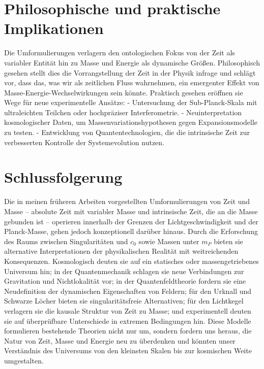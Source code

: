 \documentclass[a4paper,12pt]{article}
\begin{document}
	\section{Philosophische und praktische Implikationen}
	Die Umformulierungen verlagern den ontologischen Fokus von der Zeit als variabler Entität hin zu Masse und Energie als dynamische Größen. Philosophisch gesehen stellt dies die Vorrangstellung der Zeit in der Physik infrage und schlägt vor, dass das, was wir als zeitlichen Fluss wahrnehmen, ein emergenter Effekt von Masse-Energie-Wechselwirkungen sein könnte. Praktisch gesehen eröffnen sie Wege für neue experimentelle Ansätze:
	- Untersuchung der Sub-Planck-Skala mit ultraleichten Teilchen oder hochpräziser Interferometrie.
	- Neuinterpretation kosmologischer Daten, um Massenvariationshypothesen gegen Expansionsmodelle zu testen.
	- Entwicklung von Quantentechnologien, die die intrinsische Zeit zur verbesserten Kontrolle der Systemevolution nutzen.
	
	\section{Schlussfolgerung}
	Die in meinen früheren Arbeiten vorgestellten Umformulierungen von Zeit und Masse – absolute Zeit mit variabler Masse und intrinsische Zeit, die an die Masse gebunden ist – operieren innerhalb der Grenzen der Lichtgeschwindigkeit und der Planck-Masse, gehen jedoch konzeptionell darüber hinaus. Durch die Erforschung des Raums zwischen Singularitäten und \( c_0 \) sowie Massen unter \( m_P \) bieten sie alternative Interpretationen der physikalischen Realität mit weitreichenden Konsequenzen. Kosmologisch deuten sie auf ein statisches oder massengetriebenes Universum hin; in der Quantenmechanik schlagen sie neue Verbindungen zur Gravitation und Nichtlokalität vor; in der Quantenfeldtheorie fordern sie eine Neudefinition der dynamischen Eigenschaften von Feldern; für den Urknall und Schwarze Löcher bieten sie singularitätsfreie Alternativen; für den Lichtkegel verlagern sie die kausale Struktur von Zeit zu Masse; und experimentell deuten sie auf überprüfbare Unterschiede in extremen Bedingungen hin. Diese Modelle formulieren bestehende Theorien nicht nur um, sondern fordern uns heraus, die Natur von Zeit, Masse und Energie neu zu überdenken und könnten unser Verständnis des Universums von den kleinsten Skalen bis zur kosmischen Weite umgestalten.
	
\end{document}
